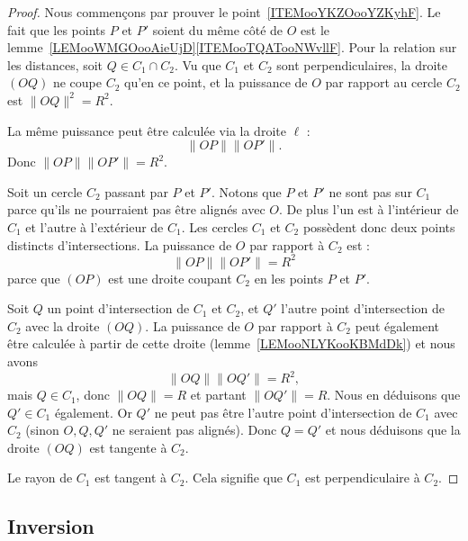 \begin{proof}
	Nous commençons par prouver le point~\ref{ITEMooYKZOooYZKyhF}. Le fait que les points \( P\) et \( P'\) soient du même côté de \( O\) est le lemme~\ref{LEMooWMGOooAieUjD}\ref{ITEMooTQATooNWvllF}. Pour la relation sur les distances, soit \( Q\in C_1\cap C_2\). Vu que \( C_1\) et \( C_2\) sont perpendiculaires, la droite \( (OQ)\) ne coupe \( C_2\) qu'en ce point, et la puissance de \( O\) par rapport au cercle \( C_2\) est \( \| OQ \|^2=R^2\).

	La même puissance peut être calculée via la droite \( \ell\) :
	\begin{equation}
		\| OP \|\| OP' \|.
	\end{equation}
	Donc \( \| OP \|\| OP' \|=R^2\).

	Soit un cercle \( C_2\) passant par \( P\) et \( P'\). Notons que \( P\) et \( P'\) ne sont pas sur \( C_1\) parce qu'ils ne pourraient pas être alignés avec \( O\). De plus l'un est à l'intérieur de \( C_1\) et l'autre à l'extérieur de \( C_1\). Les cercles \( C_1\) et \( C_2\) possèdent donc deux points distincts d'intersections.
	La puissance de \( O\) par rapport à \( C_2\) est :
	\begin{equation}
		\| OP \|\| OP' \|=R^2
	\end{equation}
	parce que \( (OP)\) est une droite coupant \( C_2\) en les points \( P\) et \( P'\).

	Soit \( Q\) un point d'intersection de \( C_1\) et \( C_2\), et \( Q'\) l'autre point d'intersection de \( C_2\) avec la droite \( (OQ)\). La puissance de \( O\) par rapport à \( C_2\) peut également être calculée à partir de cette droite (lemme~\ref{LEMooNLYKooKBMdDk}) et nous avons
	\begin{equation}
		\| OQ \|\| OQ' \|=R^2,
	\end{equation}
	mais \( Q\in C_1\), donc \( \| OQ \|=R\) et partant \( \| OQ' \|=R\). Nous en déduisons que \( Q'\in C_1\) également. Or \( Q'\) ne peut pas être l'autre point d'intersection de \( C_1\) avec \( C_2\) (sinon \( O,Q,Q'\) ne seraient pas alignés). Donc \( Q=Q'\) et nous déduisons que la droite \( (OQ)\) est tangente à \( C_2\).

	Le rayon de \( C_1\) est tangent à \( C_2\). Cela signifie que $C_1$ est perpendiculaire à \( C_2\).
\end{proof}

\subsection{Inversion}

